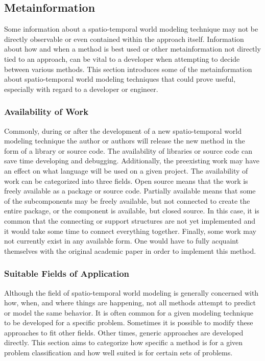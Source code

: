   \subsection{ Metainformation }

  Some information about a spatio-temporal world modeling technique may not be
  directly observable or even contained within the approach itself. Information
  about how and when a method is best used or other metainformation not directly
  tied to an approach, can be vital to a developer
  when attempting to decide between various methods. This section introduces
  some of the metainformation about spatio-temporal world modeling techniques
  that could prove useful, especially with regard to a developer or engineer. \\

  \subsubsection{ Availability of Work }
  Commonly, during or after the development of a new spatio-temporal world
  modeling technique the author or authors will release the new method in the
  form of a library or source code. The availability of libraries or source code
  can save time developing
  and debugging. Additionally, the preexisting work may have an effect
  on what language will be used on a given project. The availability of work
  can be categorized into three fields. Open source means that the work is
  freely available as a package or source code.
  Partially available means that some of the subcomponents may be freely available, but not connected to create the entire package, or the
  component is available, but closed source.
  In this case, it is common that the connecting or support structures are not yet implemented and it
  would take some time to connect everything together. Finally, some work
  may not currently exist in any available form. One would have
  to fully acquaint themselves with the original academic paper in order to
  implement this method. \\

  \subsubsection{ Suitable Fields of Application }
  Although the field of spatio-temporal world modeling is generally concerned
  with how, when, and where things are happening, not all methods attempt to
  predict or model the same behavior. It is often common for a given modeling
  technique to be developed for a specific problem. Sometimes it is possible to
  modify these approaches to fit other fields. Other times, generic
  approaches are developed directly. This section aims to categorize how specific
  a method is for a given problem classification and how well suited is for certain
  sets of problems. \\


